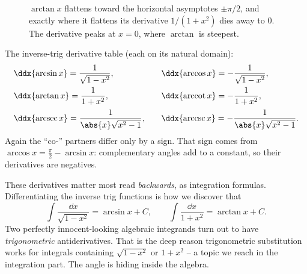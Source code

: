 \begin{figure}[H]
\centering
{}
\caption{$\arctan x$ flattens toward the horizontal asymptotes
$\pm\pi/2$, and exactly where it flattens its derivative $1/(1+x^2)$ dies
away to $0$. The derivative peaks at $x=0$, where $\arctan$ is steepest.}
\label{ch12:fig-arctan}
\end{figure}

\begin{focusbox}
The inverse-trig derivative table (each on its natural domain):
\[
\begin{array}{ll}
\ddx{\arcsin x} = \dfrac{1}{\sqrt{1-x^2}}, &\quad
\ddx{\arccos x} = -\dfrac{1}{\sqrt{1-x^2}}, \\[10pt]
\ddx{\arctan x} = \dfrac{1}{1+x^2}, &\quad
\ddx{\operatorname{arccot} x} = -\dfrac{1}{1+x^2}, \\[10pt]
\ddx{\operatorname{arcsec} x} = \dfrac{1}{\abs{x}\sqrt{x^2-1}}, &\quad
\ddx{\operatorname{arccsc} x} = -\dfrac{1}{\abs{x}\sqrt{x^2-1}}.
\end{array}
\]
Again the ``co-'' partners differ only by a sign. That sign comes from
$\arccos x = \tfrac\pi2 - \arcsin x$: complementary angles add to a constant,
so their derivatives are negatives.
\end{focusbox}

\begin{connectionbox}
These derivatives matter most read \emph{backwards}, as integration
formulas. Differentiating the inverse trig functions is how we discover that
\[
   \int \frac{\dd x}{\sqrt{1-x^2}} = \arcsin x + C,
   \qquad
   \int \frac{\dd x}{1+x^2} = \arctan x + C.
\]
Two perfectly innocent-looking algebraic integrands turn out to have
\emph{trigonometric} antiderivatives. That is the deep reason
trigonometric substitution works for integrals containing $\sqrt{1-x^2}$ or
$1+x^2$ -- a topic we reach in the integration part. The angle is hiding
inside the algebra.
\end{connectionbox}

